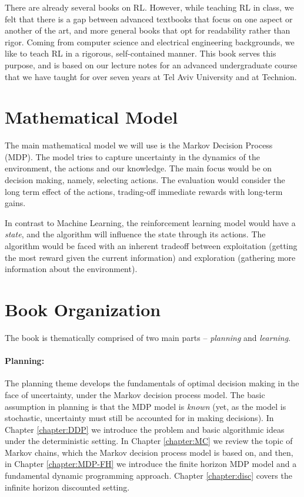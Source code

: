 There are already several books on RL. However, while teaching RL in class, we felt that there is a gap between advanced textbooks that focus on one aspect or another of the art, and more general books that opt for readability rather than rigor. Coming from computer science and electrical engineering backgrounds, we like to teach RL in a rigorous, self-contained manner. This book serves this purpose, and is based on our lecture notes for an advanced undergraduate course that we have taught for over seven years at Tel Aviv University and at Technion.

\section{Mathematical Model}
%
The main mathematical model we will use is the Markov Decision Process
(MDP). The model tries to capture uncertainty in the dynamics of the
environment, the actions and our knowledge. The main focus would be
on decision making, namely, selecting actions. The evaluation would
consider the long term effect of the actions, trading-off immediate
rewards with long-term gains.

In contrast to Machine Learning, the reinforcement learning model
would have a {\em state}, and the algorithm will influence the state
through its actions.
The algorithm would be faced with an inherent tradeoff between
exploitation (getting the most reward given the current information)
and exploration (gathering more information about the environment).



\section{Book Organization}

The book is thematically comprised of two main parts -- \textit{planning} and \textit{learning}. 

\paragraph{Planning:} The planning theme develops the fundamentals of optimal decision making in the face of uncertainty, under the Markov decision process model. The basic assumption in planning is that the MDP model is \textit{known} (yet, as the model is stochastic, uncertainty must still be accounted for in making decisions).
In Chapter \ref{chapter:DDP} we introduce the problem and basic algorithmic ideas under the deterministic setting. In Chapter \ref{chapter:MC} we review the topic of Markov chains, which the Markov decision process model is based on, and
then, in Chapter \ref{chapter:MDP-FH} we introduce the finite horizon MDP model and a fundamental dynamic programming approach. Chapter \ref{chapter:disc} covers the infinite horizon discounted setting.

